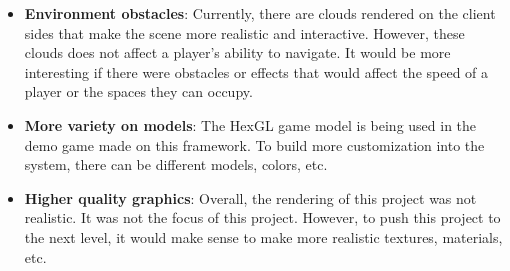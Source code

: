 \documentclass{acmsiggraph}
\begin{document}
\begin{itemize}
    \item{\textbf{Environment obstacles}: Currently, there are clouds rendered on the client sides that make the scene more realistic and interactive. However, these clouds does not affect a player's ability to navigate. It would be more interesting if there were obstacles or effects that would affect the speed of a player or the spaces they can occupy.}
    \item{\textbf{More variety on models}: The HexGL game model is being used in the demo game made on this framework. To build more customization into the system, there can be different models, colors, etc.}
    \item{\textbf{Higher quality graphics}: Overall, the rendering of this project was not realistic. It was not the focus of this project. However, to push this project to the next level, it would make sense to make more realistic textures, materials, etc.}
\end{itemize}
\end{document}

